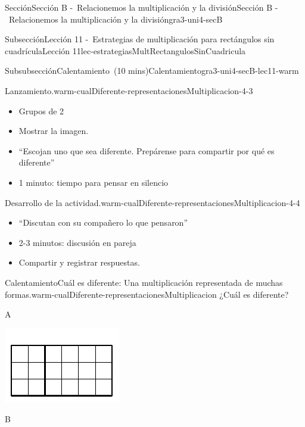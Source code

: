 \documentclass[oneside,10pt,]{article}
\begin{document}
\begin{sectionptx}{Sección}{Sección B -~Relacionemos la multiplicación y la división}{}{Sección B -~Relacionemos la multiplicación y la división}{}{}{gra3-uni4-secB}
\begin{subsectionptx}{Subsección}{Lección 11 -~Estrategias de multiplicación para rectángulos sin cuadrícula}{}{Lección 11}{}{}{lec-estrategiasMultRectangulosSinCuadricula}
\begin{subsubsectionptx}{Subsubsección}{Calentamiento~(10 mins)}{}{Calentamiento}{}{}{gra3-uni4-secB-lec11-warm}
\begin{paragraphs}{Lanzamiento.}{warm-cualDiferente-representacionesMultiplicacion-4-3}
\begin{itemize}[label=\textbullet]
\item{}Grupos de 2%
\item{}Mostrar la imagen.%
\item{}``Escojan uno que sea diferente. Prepárense para compartir por qué es diferente''%
\item{}1 minuto: tiempo para pensar en silencio%
\end{itemize}
\end{paragraphs}%
\begin{paragraphs}{Desarrollo de la actividad.}{warm-cualDiferente-representacionesMultiplicacion-4-4}%
%
\begin{itemize}[label=\textbullet]
\item{}``Discutan con su compañero lo que pensaron''%
\item{}2-3 minutos: discusión en pareja%
\item{}Compartir y registrar respuestas.%
\end{itemize}
\end{paragraphs}%
\begin{exploration}{Calentamiento}{Cuál es diferente: Una multiplicación representada de muchas formas.}{warm-cualDiferente-representacionesMultiplicacion}%
¿Cuál es diferente?%
\begin{sidebyside}{2}{0.05}{0.05}{0.1}%
\begin{sbspanel}{0.4}%
A%
\par
\includegraphics[width=\linewidth]{external/svg-source/tikz-file-153081.pdf}
\end{sbspanel}%
\begin{sbspanel}{0.4}%
B%
\par

\end{sbspanel}
\end{sidebyside}
\end{exploration}
\end{subsubsectionptx}
\end{subsectionptx}
\end{sectionptx}
\end{document}
